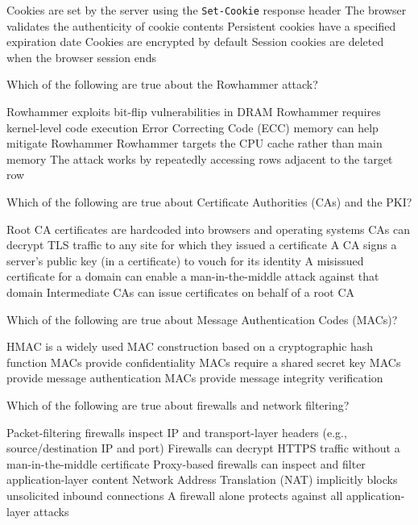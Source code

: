 \documentclass[addpoints]{exam}
\begin{document}
\begin{questions}
\begin{checkboxes}
  \CorrectChoice Cookies are set by the server using the \texttt{Set-Cookie} response header
  \choice The browser validates the authenticity of cookie contents
  \CorrectChoice Persistent cookies have a specified expiration date
  \choice Cookies are encrypted by default
  \CorrectChoice Session cookies are deleted when the browser session ends
\end{checkboxes}


\question Which of the following are true about the Rowhammer attack?

\begin{checkboxes}
  \CorrectChoice Rowhammer exploits bit-flip vulnerabilities in DRAM
  \choice Rowhammer requires kernel-level code execution
  \CorrectChoice Error Correcting Code (ECC) memory can help mitigate Rowhammer
  \choice Rowhammer targets the CPU cache rather than main memory
  \CorrectChoice The attack works by repeatedly accessing rows adjacent to the target row
\end{checkboxes}


\question Which of the following are true about Certificate Authorities (CAs) and the PKI?

\begin{checkboxes}
  \CorrectChoice Root CA certificates are hardcoded into browsers and operating systems
  \choice CAs can decrypt TLS traffic to any site for which they issued a certificate
  \CorrectChoice A CA signs a server's public key (in a certificate) to vouch for its identity
  \CorrectChoice A misissued certificate for a domain can enable a man-in-the-middle attack against that domain
  \CorrectChoice Intermediate CAs can issue certificates on behalf of a root CA
\end{checkboxes}


\question Which of the following are true about Message Authentication Codes (MACs)?

\begin{checkboxes}
  \CorrectChoice HMAC is a widely used MAC construction based on a cryptographic hash function
  \choice MACs provide confidentiality
  \CorrectChoice MACs require a shared secret key
  \CorrectChoice MACs provide message authentication
  \CorrectChoice MACs provide message integrity verification
\end{checkboxes}


\question Which of the following are true about firewalls and network filtering?

\begin{checkboxes}
  \CorrectChoice Packet-filtering firewalls inspect IP and transport-layer headers (e.g., source/destination IP and port)
  \choice Firewalls can decrypt HTTPS traffic without a man-in-the-middle certificate
  \CorrectChoice Proxy-based firewalls can inspect and filter application-layer content
  \CorrectChoice Network Address Translation (NAT) implicitly blocks unsolicited inbound connections
  \choice A firewall alone protects against all application-layer attacks
\end{checkboxes}




\end{questions}
\end{document}
